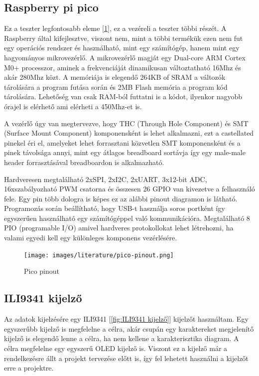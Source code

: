 \subsection{Raspberry pi pico}

Ez a teszter legfontosabb eleme [\ref{fig:Pico_pinout}], ez a vezéreli a teszter többi részét. A Raspberry 
által kifejlesztve, viszont nem, mint a többi termékük ezen nem fut egy operációs 
rendszer és használható, mint egy számítógép, hanem mint egy hagyományos 
mikrovezérlő. A mikrovezérlő magját egy Dual-core ARM Cortex M0+ processzor, 
aminek a frekvenciáját dinamikusan változtatható 16Mhz és akár 280Mhz közt. A 
memóriája is elegendő 264KB of SRAM a változók tárolására a program futása során 
és 2MB Flash memória a program kód tárolására. Lehetőség van csak RAM-ból futtatni 
is a kódot, ilyenkor nagyobb órajel is elérhető ami elérheti a 450Mhz-et is.

A vezérlő úgy van megtervezve, hogy THC (Through Hole Component) és SMT 
(Surface Mount Component) komponensként is lehet alkalmazni, 
ezt a castellated pinekel éri el, amelyeket lehet forrasztani közvetlen SMT 
komponensként és a pinek távolsága annyi, mint egy átlagos breadboard sortávja így 
egy male-male header forrasztásával breadboardon is alkalmazható. 

Hardveresen 
megtalálható 2xSPI, 2xI2C, 2xUART, 3x12-bit ADC, 16xszabályozható PWM csatorna és 
összesen 26 GPIO van kivezetve a felhasználó fele. Egy pin több dologra is képes 
ez az alábbi pinout diagramon is látható. Programozás során beállítható, hogy 
USB-t használja soros portként így egyszerűen használható egy számítógéppel való 
kommunikációra. Megtalálható 8 PIO (programable I/O) amivel hardveres protokollokat 
lehet létrehozni, ha valami egyedi kell egy különleges komponens vezérlésére. 


\begin{figure}[H]
    \centering
    \texttt{[image: images/literature/pico-pinout.png]}
    \caption{Pico pinout}
    \label{fig:Pico_pinout}
\end{figure}


\subsection{ILI9341 kijelző}

Az adatok kijelzésére egy ILI9341 [\ref{fig:ILI9341 kijelző}] kijelzőt használtam.
Egy egyszerűbb kijelző is megfelelne a célra, akár csupán egy karaktereket megjelenítő
kijelző is elegendő lenne a célra, ha nem kellene a karakterisztika diagram. A 
célra megfelelne egy egyszerű OLED kijelző is. Viszont ez a kijelző már a rendelkezésre
állt a projekt tervezése előtt is, így fel lehetett használni a kijelzőt erre a 
projektre.

